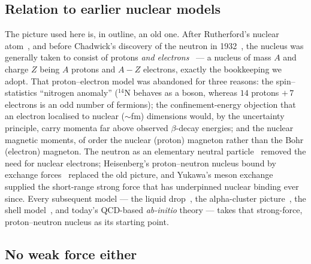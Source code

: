 \documentclass[11pt]{article}
\begin{document}
\subsection{Relation to earlier nuclear models}

The picture used here is, in outline, an old one. After Rutherford's nuclear
atom~\cite{Rutherford1911}, and before Chadwick's discovery of the neutron in
1932~\cite{Chadwick1932}, the nucleus was generally taken to consist of protons \emph{and
electrons}~\cite{BetheBacher1936} --- a nucleus of mass $A$ and charge $Z$ being $A$ protons and
$A-Z$ electrons, exactly the bookkeeping we adopt. That proton--electron model was abandoned for three reasons:
the spin--statistics ``nitrogen anomaly'' ($^{14}$N behaves as a boson, whereas $14$ protons
$+\,7$ electrons is an odd number of fermions); the confinement-energy objection that an
electron localised to nuclear ($\sim$fm) dimensions would, by the uncertainty principle, carry
momenta far above observed $\beta$-decay energies; and the nuclear magnetic moments, of order
the nuclear (proton) magneton rather than the Bohr (electron) magneton. The neutron as an
elementary neutral particle~\cite{Iwanenko1932} removed the need for nuclear electrons;
Heisenberg's proton--neutron nucleus bound by exchange forces~\cite{Heisenberg1932} replaced the
old picture, and Yukawa's meson exchange~\cite{Yukawa1935} supplied the short-range strong force
that has underpinned nuclear binding ever since. Every subsequent model --- the liquid
drop~\cite{Weizsacker1935}, the alpha-cluster picture~\cite{Wheeler1937,HafstadTeller1938}, the
shell model~\cite{Mayer1949,Haxel1949}, and today's QCD-based \emph{ab-initio} theory --- takes
that strong-force, proton--neutron nucleus as its starting point.

\subsection{No weak force either}
\end{document}
